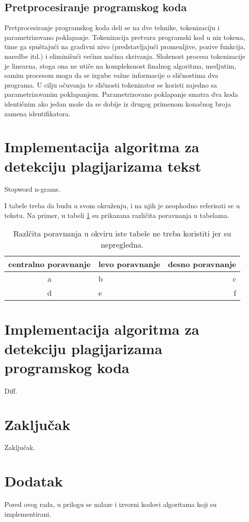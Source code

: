\documentclass[a4paper]{article}
\begin{document}
\subsection{Pretprocesiranje programskog koda}
\label{subsec:pretprocesiranje programskog koda}

Pretprocesiranje programskog koda deli se na dve tehnike, tokenizaciju i parametrizovano poklapanje. Tokenizacija pretvara programski kod u niz tokena, time ga spuštajući na gradivni nivo (predstavljajući promenljive, pozive funkcija, naredbe itd.) i eliminišući većinu načina skrivanja. Složenost procesa tokenizacije je linearna, stoga ona ne utiče na kompleksnost finalnog algoritma, medjutim, samim procesom mogu da se izgube važne informacije o sličnostima dva programa. U cilju očuvanja te sličnosti tokenizator se koristi zajedno sa parametrizovanim poklapanjem. Parametrizovano poklapanje smatra dva koda identičnim ako jedan može da se dobije iz drugog primenom konačnog broja zamena identifikatora.

\section{Implementacija algoritma za detekciju plagijarizama tekst}
\label{sec:implementacija algoritma za detekciju plagijarizama tekst}

Stopword n-grams.

I tabele treba da budu u svom okruženju, i na njih je neophodno referisati se u tekstu. Na primer, u tabeli \ref{tab:tabela1} su prikazana različita poravnanja u tabelama.

\begin{table}[h!]
\begin{center}
\caption{Razlčita poravnanja u okviru iste tabele ne treba koristiti jer su nepregledna.}
\begin{tabular}{|c|l|r|} \hline
centralno poravnanje& levo poravnanje& desno poravnanje\\ \hline
a &b&c\\ \hline
d &e&f\\ \hline
\end{tabular}
\label{tab:tabela1}
\end{center}
\end{table}


\section{Implementacija algoritma za detekciju plagijarizama programskog koda}
\label{sec:implementacija algoritma za detekciju plagijarizama programskog koda}

Diff.

\section{Zaključak}
\label{sec:zakljucak}

Zaključak. 


\appendix
 


\appendix
\section{Dodatak}

Pored ovog rada, u prilogu se nalaze i izvorni kodovi algoritama koji su implementirani.
\end{document}
